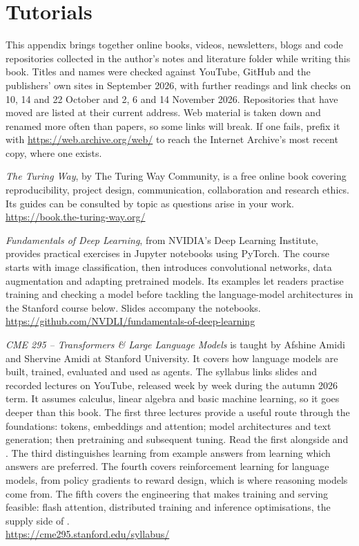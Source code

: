 \chapter{Tutorials}
\label{app:tutorials}

This appendix brings together online books, videos, newsletters, blogs and code repositories
collected in the author's notes and literature folder while writing this book.
Titles and names were checked against YouTube, GitHub and the publishers'
own sites in September 2026, with further readings and link checks on
10, 14 and 22 October and 2, 6 and 14 November 2026. Repositories that have moved are listed at their
current address. Web material is taken down and renamed more often than
papers, so some links will break. If one fails, prefix it with
\url{https://web.archive.org/web/} to reach the Internet Archive's most
recent copy, where one exists.

\begingroup
\renewcommand{\UrlFont}{\small\ttfamily}

\emph{The Turing Way}, by The Turing Way Community, is a free online book
covering reproducibility, project design, communication, collaboration and
research ethics. Its guides can be consulted by topic as questions arise in
your work.\\
\url{https://book.the-turing-way.org/}

\emph{Fundamentals of Deep Learning}, from NVIDIA's Deep Learning Institute,
provides practical exercises in Jupyter notebooks using PyTorch. The course
starts with image classification, then introduces convolutional networks,
data augmentation and adapting pretrained models. Its examples let readers
practise training and checking a model before tackling the language-model
architectures in the Stanford course below. Slides accompany the notebooks.\\
\url{https://github.com/NVDLI/fundamentals-of-deep-learning}

\emph{CME 295 -- Transformers \& Large Language Models} is taught by Afshine
Amidi and Shervine Amidi at Stanford University. It covers how language
models are built, trained, evaluated and used as agents. The syllabus links
slides and recorded lectures on YouTube, released week by week during the
autumn 2026 term. It assumes calculus, linear algebra and basic machine
learning, so it goes deeper than this book. The first three lectures provide
a useful route through the foundations: tokens, embeddings and attention;
model architectures and text generation; then pretraining and subsequent
tuning. Read the first alongside \textcite{vaswani2017attention} and
. The third distinguishes learning from example answers from
learning which answers are preferred. The fourth covers reinforcement learning
for language models, from policy gradients to reward design, which is where
reasoning models come from. The fifth covers the engineering that makes
training and serving feasible: flash attention, distributed training and
inference optimisations, the supply side of .\\
\url{https://cme295.stanford.edu/syllabus/}

